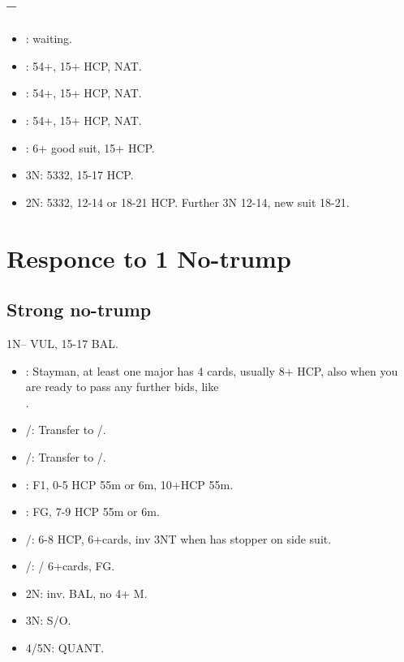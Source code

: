 \documentclass[12pt,twoside,a5paper]{report}%
\begin{document}
	\section*{--}
	\begin{itemize}
	\renewcommand{\labelitemi}{}
	\item {}: waiting.
	\item {}: 5\he{}4\cl{}+, 15+ HCP, NAT.
	\item {}: 5\sp{}4\di{}+, 15+ HCP, NAT.
	\item {}: 5\sp{}4\he{}+, 15+ HCP, NAT.
	\item {}: 6\sp{}+ good suit, 15+ HCP.
	\item 3N: 5332, 15-17 HCP.
	\item 2N: 5332, 12-14 or 18-21 HCP. Further 3N 12-14, new suit 18-21.
	\end{itemize}

\chapter*{Responce to 1 No-trump}
	\section*{Strong no-trump}
	1N-- VUL, 15-17 BAL.
	\begin{itemize}
	\renewcommand{\labelitemi}{}
	\item {}: Stayman, at least one major has 4 cards, usually 8+ HCP, also when you are ready to pass any further bids, like \\.
	\item {}/\he{}: Transfer to /\sp{}.
	\item {}/\he{}: Transfer to /\sp{}.
	\item {}: F1, 0-5 HCP 55m or 6m, 10+HCP 55m.
	\item {}: FG, 7-9 HCP 55m or 6m.
	\item {}/\di{}: 6-8 HCP, 6+cards, inv 3NT when has stopper on side suit.
	\item {}/\sp{}: \cl{}/\di{} 6+cards, FG.
	\item 2N: inv. BAL, no 4+ M.
	\item 3N: S/O.
	\item 4/5N: QUANT.
	\end{itemize}
\end{document}
